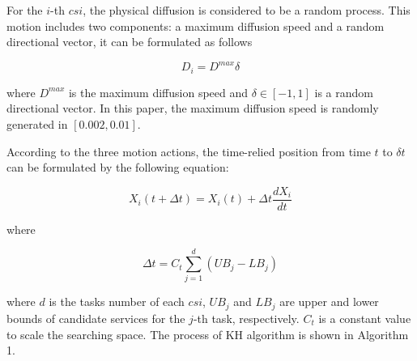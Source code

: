 \documentclass[10pt,journal,compsoc]{IEEEtran}
\begin{document}
For the $i$-th $csi$, the physical diffusion is considered to be a random process. This motion includes two components: a maximum diffusion speed and a random directional vector, it can be formulated as follows

\begin{equation}
D_i = D^{max}\delta
\end{equation}

where $D^{max}$ is the maximum diffusion speed and $\delta \in [-1, 1]$ is a random directional vector. In this paper, the maximum diffusion speed is randomly generated in $[0.002, 0.01]$. 

According to the three motion actions, the time-relied position from time $t$ to $\delta t$ can be formulated by the following equation:

\begin{equation}
X_i(t+\Delta t) = X_i(t) + \Delta t \frac{dX_i}{dt}
\end{equation}

where

\begin{equation}
\Delta t = C_t\sum_{j=1}^{d}(UB_j - LB_j)
\end{equation}

where $d$ is the tasks number of each $csi$, $UB_j$ and $LB_j$ are upper and lower bounds of candidate services for the $j$-th task, respectively. $C_t$ is a constant value to scale the searching space. The process of KH algorithm is shown in Algorithm 1.
\end{document}
